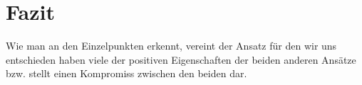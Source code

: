 \section*{Fazit}
Wie man an den Einzelpunkten erkennt, vereint der Ansatz für den wir uns entschieden haben viele der positiven Eigenschaften der beiden anderen Ansätze bzw. stellt einen Kompromiss zwischen den beiden dar.
% 

